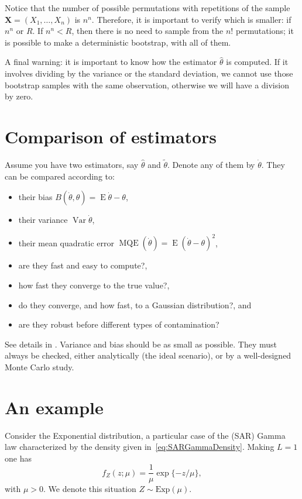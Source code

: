 Notice that the number of possible permutations with repetitions of the sample $\bm X=(X_1,\dots,X_n)$ is $n^n$.
Therefore, it is important to verify which is smaller: if $n^n$ or $R$.
If $n^n < R$, then there is no need to sample from the $n!$ permutations; it is possible to make a deterministic bootstrap, with all of them.

A final warning: it is important to know how the estimator $\widehat{\theta}$ is computed.
If it involves dividing by the variance or the standard deviation, we cannot use those bootstrap samples with the same observation, otherwise we will have a division by zero.

\section{Comparison of estimators}

Assume you have two estimators, say $\widehat{\theta}$ and $\widetilde{\theta}$.
Denote any of them by $\dot\theta$.
They can be compared according to:
\begin{itemize}
\item their bias $B(\dot{\theta},\theta)=\operatorname{E}\dot\theta-\theta$,
\item their variance $\operatorname{Var}\dot{\theta}$,
\item their mean quadratic error $\operatorname{MQE}(\dot{\theta}) = \operatorname{E}(\dot{\theta}-\theta)^2$,
\item are they fast and easy to compute?,
\item how fast they converge to the true value?,
\item do they converge, and how fast, to a Gaussian distribution?, and
\item are they robust before different types of contamination?
\end{itemize}
See details in \citet{busto92}.
Variance and bias should be as small as possible.
They must always be checked, either analytically (the ideal scenario), or by a well-designed Monte Carlo study.

\section{An example}

Consider the Exponential distribution, a particular case of the (SAR) Gamma law characterized by the density given in~\eqref{eq:SARGammaDensity}.
Making $L=1$ one has
\begin{equation}
f_Z(z;\mu) = \frac{1}{\mu} \exp\{-z/\mu\},
\label{eq:ExpDensity}
\end{equation}
with $\mu>0$.
We denote this situation $Z\sim \text{Exp}(\mu)$.

